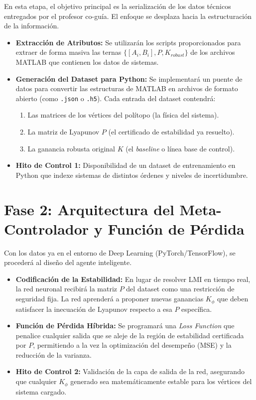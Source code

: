 \documentclass[12pt,twoside]{report}
\begin{document}
En esta etapa, el objetivo principal es la serialización de los datos técnicos entregados por el profesor co-guía. El enfoque se desplaza hacia la estructuración de la información.

\begin{itemize}
    \item \textbf{Extracción de Atributos:} Se utilizarán los scripts proporcionados para extraer de forma masiva las ternas $\{[A_i, B_i], P, K_{robust}\}$ de los archivos MATLAB que contienen los datos de sistemas. 
    \item \textbf{Generación del Dataset para Python:} Se implementará un puente de datos para convertir las estructuras de MATLAB en archivos de formato abierto (como \texttt{.json} o \texttt{.h5}). Cada entrada del dataset contendrá:
        \begin{enumerate}
            \item Las matrices de los vértices del polítopo (la física del sistema).
            \item La matriz de Lyapunov $P$ (el certificado de estabilidad ya resuelto).
            \item La ganancia robusta original $K$ (el \textit{baseline} o línea base de control).
        \end{enumerate}
    \item \textbf{Hito de Control 1:} Disponibilidad de un dataset de entrenamiento en Python que indexe sistemas de distintos órdenes y niveles de incertidumbre.
\end{itemize}

\section{Fase 2: Arquitectura del Meta-Controlador y Función de Pérdida}

Con los datos ya en el entorno de Deep Learning (PyTorch/TensorFlow), se procederá al diseño del agente inteligente.

\begin{itemize}
    \item \textbf{Codificación de la Estabilidad:} En lugar de resolver LMI en tiempo real, la red neuronal recibirá la matriz $P$ del dataset como una restricción de seguridad fija. La red aprenderá a proponer nuevas ganancias $K_{\phi}$ que deben satisfacer la inecuación de Lyapunov respecto a esa $P$ específica.
    \item \textbf{Función de Pérdida Híbrida:} Se programará una \textit{Loss Function} que penalice cualquier salida que se aleje de la región de estabilidad certificada por $P$, permitiendo a la vez la optimización del desempeño (MSE) y la reducción de la varianza.
    \item \textbf{Hito de Control 2:} Validación de la capa de salida de la red, asegurando que cualquier $K_{\phi}$ generado sea matemáticamente estable para los vértices del sistema cargado.
\end{itemize}
\end{document}
